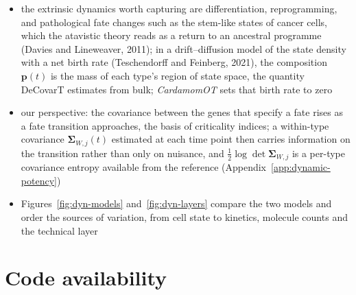 \documentclass[pdflatex, sn-nature]{sn-jnl}
\theoremstyle{thmstyleone}%
\theoremstyle{thmstyletwo}%
\theoremstyle{thmstylethree}%
\begin{document}
\begin{itemize}
  \item the extrinsic dynamics worth capturing are differentiation, reprogramming, and pathological fate changes such as
        the stem-like states of cancer cells, which the atavistic theory reads as a return to an ancestral programme
        (Davies and Lineweaver, 2011); in a drift--diffusion model of the state density with a net birth rate
        (Teschendorff and Feinberg, 2021), the composition \(\boldsymbol{p}(t)\) is the mass of each type's region of state
        space, the quantity DeCovarT estimates from bulk; \emph{CardamomOT} sets that birth rate to zero
  \item our perspective: the covariance between the genes that specify a fate rises as a fate transition approaches, the
        basis of criticality indices; a within-type covariance \(\boldsymbol{\Sigma}_{W,j}(t)\) estimated at each time point then
        carries information on the transition rather than only on nuisance, and \(\tfrac12\log\det\boldsymbol{\Sigma}_{W,j}\) is a
        per-type covariance entropy available from the reference (Appendix~\ref{app:dynamic-potency})
  \item Figures~\ref{fig:dyn-models} and~\ref{fig:dyn-layers} compare the two models and order the sources of variation,
        from cell state to kinetics, molecule counts and the technical layer
\end{itemize}

\backmatter

\section{Code availability}
\end{document}
